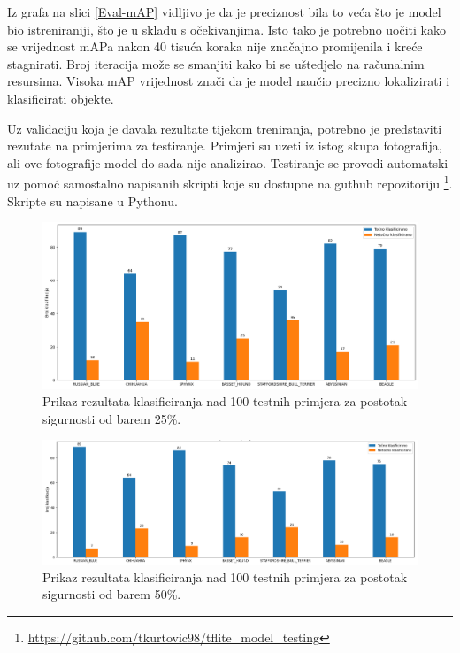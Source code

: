 Iz grafa na slici \ref{Eval-mAP} vidljivo je da je preciznost bila to veća što je model bio istreniraniji, što je u skladu s očekivanjima. Isto tako je potrebno uočiti 
kako se vrijednost mAPa nakon 40 tisuća koraka nije značajno promijenila i kreće stagnirati. Broj iteracija može se smanjiti kako bi se uštedjelo na računalnim resursima.
Visoka mAP vrijednost znači da je model naučio precizno lokalizirati i klasificirati objekte. 

Uz validaciju koja je davala rezultate tijekom treniranja, potrebno je predstaviti rezutate na primjerima za testiranje. Primjeri su uzeti iz istog skupa fotografija, ali ove fotografije
model do sada nije analizirao. Testiranje se provodi automatski uz pomoć samostalno napisanih skripti koje su dostupne na guthub repozitoriju \footnote{\url{https://github.com/tkurtovic98/tflite_model_testing}}.
Skripte su napisane u Pythonu.

\begin{figure}[htb]
    \centering
    \includegraphics[width=14cm]{img/Klasifikacija_25.png}
    \caption{Prikaz rezultata klasificiranja nad 100 testnih primjera za postotak sigurnosti od barem 25\%. }
    \label{Klasifikacija25}
\end{figure}

\begin{figure}[htb]
    \centering
    \includegraphics[width=14cm]{img/Klasifikacija_test.png}
    \caption{Prikaz rezultata klasificiranja nad 100 testnih primjera za postotak sigurnosti od barem 50\%.}
    \label{Klasifikacija50}
\end{figure}

